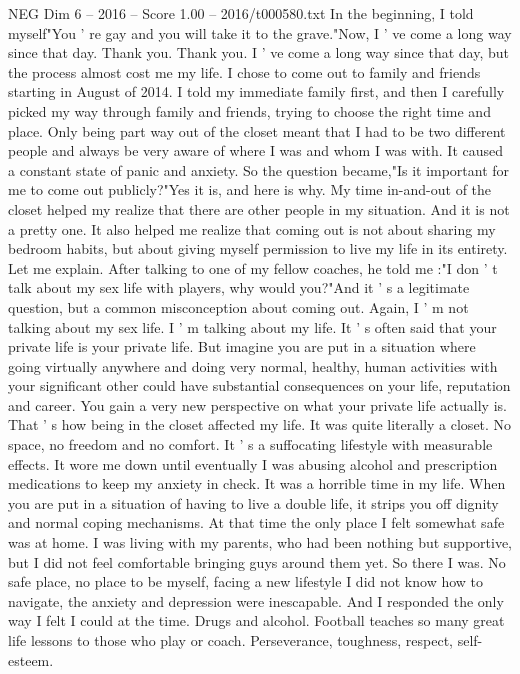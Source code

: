 \begin{textsample}{NEG Dim 6 – 2016 – Score 1.00 – 2016/t000580.txt}
In the beginning, I told myself"You ' re gay and you will take it to the grave."Now, I ' ve come a long way since that day.
Thank you.
Thank you.
I ' ve come a long way since that day, but the process almost cost me my life.
I chose to come out to family and friends starting in August of 2014.
I told my immediate family first, and then I carefully picked my way through family and friends, trying to choose the right time and place.
Only being part way out of the closet meant that I had to be two different people and always be very aware of where I was and whom I was with.
It caused a constant state of panic and anxiety.
So the question became,"Is it important for me to come out publicly?"Yes it is, and here is why.
My time in-and-out of the closet helped my realize that there are other people in my situation.
And it is not a pretty one.
It also helped me realize that coming out is not about sharing my bedroom habits, but about giving myself permission to live my life in its entirety.
Let me explain.
After talking to one of my fellow coaches, he told me :"I don ' t talk about my sex life with players, why would you?"And it ' s a legitimate question, but a common misconception about coming out.
Again, I ' m not talking about my sex life.
I ' m talking about my life.
It ' s often said that your private life is your private life.
But imagine you are put in a situation where going virtually anywhere and doing very normal, healthy, human activities with your significant other could have substantial consequences on your life, reputation and career.
You gain a very new perspective on what your private life actually is.
That ' s how being in the closet affected my life.
It was quite literally a closet.
No space, no freedom and no comfort.
It ' s a suffocating lifestyle with measurable effects.
It wore me down until eventually I was abusing alcohol and prescription medications to keep my anxiety in check.
It was a horrible time in my life.
When you are put in a situation of having to live a double life, it strips you off dignity and normal coping mechanisms.
At that time the only place I felt somewhat safe was at home.
I was living with my parents, who had been nothing but supportive, but I did not feel comfortable bringing guys around them yet.
So there I was.
No safe place, no place to be myself, facing a new lifestyle I did not know how to navigate, the anxiety and depression were inescapable.
And I responded the only way I felt I could at the time.
Drugs and alcohol.
Football teaches so many great life lessons to those who play or coach.
Perseverance, toughness, respect, self-esteem.

\end{textsample}
